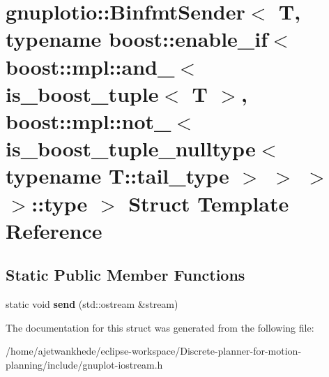 \hypertarget{structgnuplotio_1_1BinfmtSender_3_01T_00_01typename_01boost_1_1enable__if_3_01boost_1_1mpl_1_1an42b95f03faee3ff44b47c946e1ea6e52}{}\section{gnuplotio\+:\+:Binfmt\+Sender$<$ T, typename boost\+:\+:enable\+\_\+if$<$ boost\+:\+:mpl\+:\+:and\+\_\+$<$ is\+\_\+boost\+\_\+tuple$<$ T $>$, boost\+:\+:mpl\+:\+:not\+\_\+$<$ is\+\_\+boost\+\_\+tuple\+\_\+nulltype$<$ typename T\+:\+:tail\+\_\+type $>$ $>$ $>$ $>$\+:\+:type $>$ Struct Template Reference}
\label{structgnuplotio_1_1BinfmtSender_3_01T_00_01typename_01boost_1_1enable__if_3_01boost_1_1mpl_1_1an42b95f03faee3ff44b47c946e1ea6e52}
\subsection*{Static Public Member Functions}
\begin{DoxyCompactItemize}
\item 
\mbox{\label{structgnuplotio_1_1BinfmtSender_3_01T_00_01typename_01boost_1_1enable__if_3_01boost_1_1mpl_1_1an42b95f03faee3ff44b47c946e1ea6e52_a12e1b40a6ae29940661b7609df3c40ba}} 
static void {\bfseries send} (std\+::ostream \&stream)
\end{DoxyCompactItemize}


The documentation for this struct was generated from the following file\+:\begin{DoxyCompactItemize}
\item 
/home/ajetwankhede/eclipse-\/workspace/\+Discrete-\/planner-\/for-\/motion-\/planning/include/gnuplot-\/iostream.\+h\end{DoxyCompactItemize}
